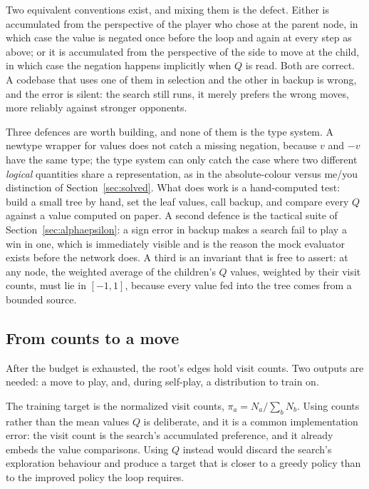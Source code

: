 Two equivalent conventions exist, and mixing them is the defect. Either
 is accumulated from the perspective of the player who chose at
the parent node, in which case the value is negated once before the loop and
again at every step as above; or it is accumulated from the perspective of the
side to move at the child, in which case the negation happens implicitly when
$Q$ is read. Both are correct. A codebase that uses one of them in selection and
the other in backup is wrong, and the error is silent: the search still runs, it
merely prefers the wrong moves, more reliably against stronger opponents.

Three defences are worth building, and none of them is the type system. A
newtype wrapper for values does not catch a missing negation, because $v$ and
$-v$ have the same type; the type system can only catch the case where two
different \emph{logical} quantities share a representation, as in the
absolute-colour versus me/you distinction of Section~\ref{sec:solved}. What does
work is a hand-computed test: build a small tree by hand, set the leaf values,
call backup, and compare every $Q$ against a value computed on paper. A second
defence is the tactical suite of Section~\ref{sec:alphaepsilon}: a sign error in
backup makes a search fail to play a win in one, which is immediately visible and
is the reason the mock evaluator exists before the network does. A third is an
invariant that is free to assert: at any node, the weighted average of the
children's $Q$ values, weighted by their visit counts, must lie in $[-1,1]$,
because every value fed into the tree comes from a bounded source.

\subsection{From counts to a move}
\label{sec:move-selection}

After the budget is exhausted, the root's edges hold visit counts. Two outputs are
needed: a move to play, and, during self-play, a distribution to train on.

The training target is the normalized visit counts, $\pi_a = N_a / \sum_b N_b$.
Using counts rather than the mean values $Q$ is deliberate, and it is a common
implementation error: the visit count is the search's accumulated preference, and
it already embeds the value comparisons. Using $Q$ instead would discard the
search's exploration behaviour and produce a target that is closer to a greedy
policy than to the improved policy the loop requires.

